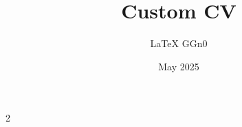 \documentclass[minimalist]{customcv}
\title{Custom CV}
\author{\LaTeX{} GGn0}
\date{May 2025}
\begin{document}
\subsection*{}
\vspace{10em}

\setlength{\columnsep}{1cm}


\begin{paracol}{2}

\setbgcolor


\flushleft
\vspace{1cm}












\switchcolumn
\flushright



\begin{minipage}[t]{0.6\textwidth}
	
\end{minipage}
\vspace{0.5cm}


\begin{minipage}[t]{0.6\textwidth}
	
\end{minipage}
\vspace{0.5cm}


\begin{minipage}[t]{0.6\textwidth}
	
\end{minipage}

\end{paracol}
\end{document}
